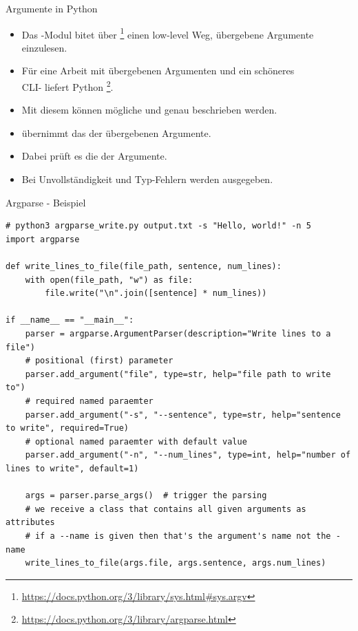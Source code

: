 \documentclass[12pt, aspectratio=169, usepdftitle=false]{beamer}
\newcommand{\pp}[1]{\lpl{#1}}
\newcommand{\furl}[1]{\footnote{\url{#1}}}
\begin{document}
\begin{frame}{Argumente in Python}
	\begin{itemize}
		\item Das \pp{sys}-Modul bitet über \pp{sys.argv}\furl{https://docs.python.org/3/library/sys.html\#sys.argv} einen low-level Weg,  übergebene Argumente einzulesen.
		
		\pause
		
		\item Für eine  Arbeit mit übergebenen Argumenten und ein schöneres\\CLI- liefert Python \pp{argparse}\furl{https://docs.python.org/3/library/argparse.html}.
		
		\pause
		
		\item Mit diesem können mögliche  und genau beschrieben werden.
		
		\pause
		
		\item \pp{argparse} übernimmt das  der übergebenen Argumente.
		
		\pause
		
		\item Dabei prüft es die  der Argumente.
		\item[] Bei Unvollständigkeit und Typ-Fehlern werden  ausgegeben.
	\end{itemize}
\end{frame}


\begin{frame}[fragile]{Argparse - Beispiel}
	\begin{lstlisting}[language=pytiny]
# python3 argparse_write.py output.txt -s "Hello, world!" -n 5
import argparse

def write_lines_to_file(file_path, sentence, num_lines):
    with open(file_path, "w") as file:
        file.write("\n".join([sentence] * num_lines))

if __name__ == "__main__":
    parser = argparse.ArgumentParser(description="Write lines to a file")
    # positional (first) parameter
    parser.add_argument("file", type=str, help="file path to write to")
    # required named paraemter
    parser.add_argument("-s", "--sentence", type=str, help="sentence to write", required=True)
    # optional named paraemter with default value
    parser.add_argument("-n", "--num_lines", type=int, help="number of lines to write", default=1)

    args = parser.parse_args()  # trigger the parsing
    # we receive a class that contains all given arguments as attributes
    # if a --name is given then that's the argument's name not the -name
    write_lines_to_file(args.file, args.sentence, args.num_lines)
	\end{lstlisting}
\end{frame}
\end{document}
